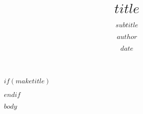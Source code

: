\documentclass[11pt,a4paper]{scrartcl}
\title{$title$}
\author{$author$}
\subtitle{$subtitle$}
\date{$date$}
\begin{document}
	
	$if(maketitle)$
	\maketitle
	$endif$
	
	$body$
\end{document}

